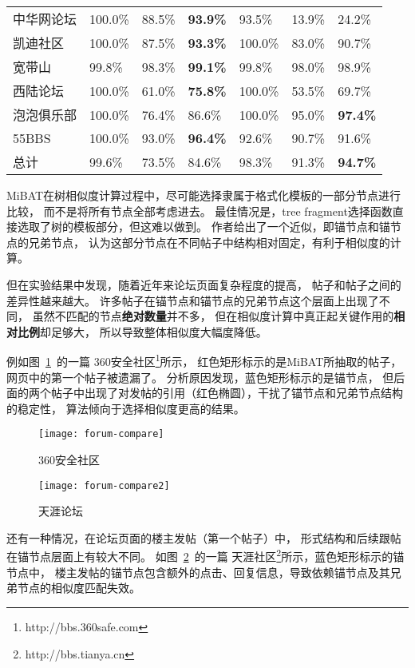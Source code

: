\begin{table}[t]
\begin{tabular}{lllllll}
中华网论坛 & 100.0\% & 88.5\% & \textbf{93.9\%} & 93.5\% & 13.9\% & 24.2\% \\
凯迪社区 & 100.0\% & 87.5\% & \textbf{93.3\%} & 100.0\% & 83.0\% & 90.7\% \\
宽带山 & 99.8\% & 98.3\% & \textbf{99.1\%} & 99.8\% & 98.0\% & 98.9\% \\
西陆论坛 & 100.0\% & 61.0\% & \textbf{75.8\%} & 100.0\% & 53.5\% & 69.7\% \\
泡泡俱乐部 & 100.0\% & 76.4\% & 86.6\% & 100.0\% & 95.0\% & \textbf{97.4\%} \\ 
55BBS & 100.0\% & 93.0\% & \textbf{96.4\%} & 92.6\% & 90.7\% & 91.6\% \\
总计 & 99.6\% & 73.5\% & 84.6\% & 98.3\% & 91.3\% & \textbf{94.7\%} \\
\bottomrule[1.5pt]
\end{tabular}
\end{table}

MiBAT在树相似度计算过程中，尽可能选择隶属于格式化模板的一部分节点进行比较，
而不是将所有节点全部考虑进去。
最佳情况是，tree fragment选择函数直接选取了树的模板部分，但这难以做到。
作者给出了一个近似，即锚节点和锚节点的兄弟节点，
认为这部分节点在不同帖子中结构相对固定，有利于相似度的计算。

但在实验结果中发现，随着近年来论坛页面复杂程度的提高，
帖子和帖子之间的差异性越来越大。
许多帖子在锚节点和锚节点的兄弟节点这个层面上出现了不同，
虽然不匹配的节点\textbf{绝对数量}并不多，
但在相似度计算中真正起关键作用的\textbf{相对比例}却足够大，
所以导致整体相似度大幅度降低。

例如图~\ref{fig:forum-compare}~的一篇
360安全社区\footnote{http://bbs.360safe.com}所示，
红色矩形标示的是MiBAT所抽取的帖子，网页中的第一个帖子被遗漏了。
分析原因发现，蓝色矩形标示的是锚节点，
但后面的两个帖子中出现了对发帖的引用（红色椭圆），干扰了锚节点和兄弟节点结构的稳定性，
算法倾向于选择相似度更高的结果。

\begin{figure}[htbp]
\centering
\texttt{[image: forum-compare]}
\caption{360安全社区}
\label{fig:forum-compare}
\end{figure}

\begin{figure}[htbp]
\centering
\texttt{[image: forum-compare2]}
\caption{天涯论坛}
\label{fig:forum-compare2}
\end{figure}

还有一种情况，在论坛页面的楼主发帖（第一个帖子）中，
形式结构和后续跟帖在锚节点层面上有较大不同。
如图~\ref{fig:forum-compare2}~的一篇
天涯社区\footnote{http://bbs.tianya.cn}所示，蓝色矩形标示的锚节点中，
楼主发帖的锚节点包含额外的点击、回复信息，导致依赖锚节点及其兄弟节点的相似度匹配失效。

